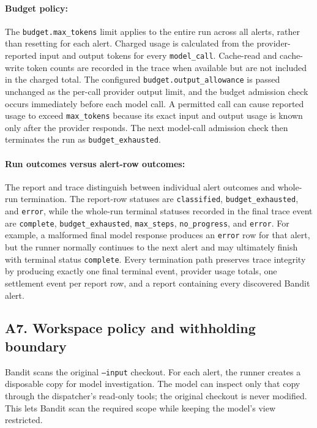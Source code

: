 \documentclass[11pt]{article}
\begin{document}
\paragraph{Budget policy:}
The \texttt{budget.max\_tokens} limit applies to the entire run across all alerts, rather than resetting for each alert. Charged usage is calculated from the provider-reported input and output tokens for every \texttt{model\_call}. Cache-read and cache-write token counts are recorded in the trace when available but are not included in the charged total. The configured \texttt{budget.}\allowbreak\texttt{output\_allowance} is passed unchanged as the per-call provider output limit, and the budget admission check occurs immediately before each model call. A permitted call can cause reported usage to exceed \texttt{max\_tokens} because its exact input and output usage is known only after the provider responds. The next model-call admission check then terminates the run as \texttt{budget\_exhausted}.

\paragraph{Run outcomes versus alert-row outcomes:}
The report and trace distinguish between individual alert outcomes and whole-run termination. The report-row statuses are \texttt{classified}, \texttt{budget\_exhausted}, and \texttt{error}, while the whole-run terminal statuses recorded in the final trace event are \texttt{complete}, \texttt{budget\_exhausted}, \texttt{max\_steps}, \texttt{no\_progress}, and \texttt{error}. For example, a malformed final model response produces an \texttt{error} row for that alert, but the runner normally continues to the next alert and may ultimately finish with terminal status \texttt{complete}. Every termination path preserves trace integrity by producing exactly one final terminal event, provider usage totals, one settlement event per report row, and a report containing every discovered Bandit alert.

\endgroup
\clearpage
\subsection*{A7. Workspace policy and withholding boundary}
Bandit scans the original \texttt{--input} checkout. For each alert, the runner creates a disposable copy for model investigation. The model can inspect only that copy through the dispatcher's read-only tools; the original checkout is never modified. This lets Bandit scan the required scope while keeping the model's view restricted.
\end{document}
